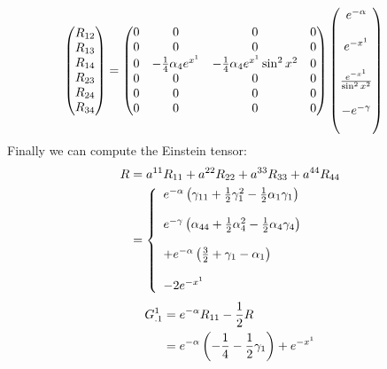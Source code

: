 \begin{align}
\begin{pmatrix}
 R_{12}\\
 R_{13}\\
 R_{14}\\
 R_{23}\\
 R_{24}\\
 R_{34}\\
\end{pmatrix}&=
\begin{pmatrix}
 0& 0& 0 & 0  \\
 0& 0 &  0& 0 \\
 0&-\frac{1}{4}\alpha_4 e^{x^1}  &-\frac{1}{4}\alpha_4 e^{x^1}\sin^2 x^2 & 0 \\
 0& 0 &0& 0 \\
 0& 0 &0& 0 \\
 0& 0 &0& 0 \\
\end{pmatrix}\begin{pmatrix}
 {e^{-\alpha}}\\\\
 {e^{-x^1}}\\\\
 \frac{e^{-x^1}}{\sin^2 x^2}\\\\
 -{e^{-\gamma}}\\\\
\end{pmatrix}
\end{align}
Finally  we can compute the Einstein tensor:
\begin{align}
 R &= a^{11}R_{11}+a^{22}R_{22}+a^{33}R_{33}+a^{44}R_{44}\\
 &= \left\{\begin{array}{l}
 e^{-\alpha}\left(\gamma_{11} + \frac{1}{2} \gamma_1^2 -\frac{1}{2}\alpha_1 \gamma_1\right)\\\\
 e^{-\gamma}\left(\alpha_{44} + \frac{1}{2} \alpha_4^2 -\frac{1}{2}\alpha_4 \gamma_4\right)\\\\
 +e^{-\alpha}\left(\frac{3}{2}+\gamma_1-\alpha_1\right)\\\\
 - 2e^{-x^1}
 \end{array}\right.
\end{align}
\begin{align}
G^1_{.1} &= e^{-\alpha}R_{11} - \frac{1}{2} R\\
 &= e^{-\alpha}\left(-\frac{1}{4} - \frac{1}{2} \gamma_1\right)+e^{-x^1}
\end{align}
